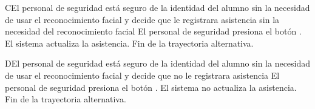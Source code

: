 \begin{UCtrayectoriaA}{C}{El personal de seguridad está seguro de la identidad del alumno sin la necesidad de usar el reconocimiento facial y decide que le registrara asistencia sin la necesidad del reconocimiento facial}
\UCpaso[\UCactor] El personal de seguridad presiona el botón .
\UCpaso El sistema actualiza la asistencia.
\UCpaso Fin de la trayectoria alternativa.
\end{UCtrayectoriaA}
\begin{UCtrayectoriaA}{D}{El personal de seguridad está seguro de la identidad del alumno sin la necesidad de usar el reconocimiento facial y decide que no le registrara asistencia}
\UCpaso[\UCactor] El personal de seguridad presiona el botón .
\UCpaso El sistema no actualiza la asistencia.
\UCpaso Fin de la trayectoria alternativa.
\end{UCtrayectoriaA}  

